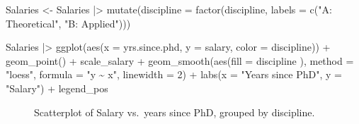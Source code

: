 \documentclass[
  letterpaper,
  10pt,
  krantz2]{krantz}
\makeatletter
\newenvironment{Shaded}{\begin{snugshade}}{\end{snugshade}}
\newcommand{\AttributeTok}[1]{\textcolor[rgb]{0.40,0.45,0.13}{#1}}
\newcommand{\DecValTok}[1]{\textcolor[rgb]{0.68,0.00,0.00}{#1}}
\newcommand{\FunctionTok}[1]{\textcolor[rgb]{0.28,0.35,0.67}{#1}}
\newcommand{\NormalTok}[1]{\textcolor[rgb]{0.00,0.23,0.31}{#1}}
\newcommand{\OtherTok}[1]{\textcolor[rgb]{0.00,0.23,0.31}{#1}}
\newcommand{\SpecialCharTok}[1]{\textcolor[rgb]{0.37,0.37,0.37}{#1}}
\newcommand{\StringTok}[1]{\textcolor[rgb]{0.13,0.47,0.30}{#1}}
\newenvironment{kframe}{%
  \medskip{}
  \setlength{\fboxsep}{.8em}
  \def\at@end@of@kframe{}%
  \ifinner\ifhmode%
  \def\at@end@of@kframe{\end{minipage}}%
  \begin{minipage}{\columnwidth}%
  \fi\fi%
  \def\FrameCommand##1{\hskip\@totalleftmargin \hskip-\fboxsep
  \colorbox{shadecolor}{##1}\hskip-\fboxsep
      \hskip-\linewidth \hskip-\@totalleftmargin \hskip\columnwidth}%
  \MakeFramed {\advance\hsize-\width
    \@totalleftmargin\z@ \linewidth\hsize
    \@setminipage}}%
{\par\unskip\endMakeFramed%
  \at@end@of@kframe}
\renewenvironment{Shaded}{\begin{kframe}}{\end{kframe}}
\makeatother
\begin{document}
\begin{Shaded}
\begin{Highlighting}[]
\NormalTok{Salaries }\OtherTok{\textless{}{-}}\NormalTok{ Salaries }\SpecialCharTok{|\textgreater{}}
  \FunctionTok{mutate}\NormalTok{(}\AttributeTok{discipline =} \FunctionTok{factor}\NormalTok{(discipline, }
                             \AttributeTok{labels =} \FunctionTok{c}\NormalTok{(}\StringTok{"A: Theoretical"}\NormalTok{, }\StringTok{"B: Applied"}\NormalTok{)))}

\NormalTok{Salaries }\SpecialCharTok{|\textgreater{}}
  \FunctionTok{ggplot}\NormalTok{(}\FunctionTok{aes}\NormalTok{(}\AttributeTok{x =}\NormalTok{ yrs.since.phd, }\AttributeTok{y =}\NormalTok{ salary, }\AttributeTok{color =}\NormalTok{ discipline)) }\SpecialCharTok{+}
    \FunctionTok{geom\_point}\NormalTok{() }\SpecialCharTok{+}
\NormalTok{  scale\_salary }\SpecialCharTok{+}
  \FunctionTok{geom\_smooth}\NormalTok{(}\FunctionTok{aes}\NormalTok{(}\AttributeTok{fill =}\NormalTok{ discipline ),}
                \AttributeTok{method =} \StringTok{"loess"}\NormalTok{, }\AttributeTok{formula =} \StringTok{"y \textasciitilde{} x"}\NormalTok{, }
                \AttributeTok{linewidth =} \DecValTok{2}\NormalTok{) }\SpecialCharTok{+} 
  \FunctionTok{labs}\NormalTok{(}\AttributeTok{x =} \StringTok{"Years since PhD"}\NormalTok{,}
       \AttributeTok{y =} \StringTok{"Salary"}\NormalTok{) }\SpecialCharTok{+}
\NormalTok{  legend\_pos }
\end{Highlighting}
\end{Shaded}

\begin{figure}[H]


\caption{\label{fig-Salaries-discipline}Scatterplot of Salary vs.~years
since PhD, grouped by discipline.}

\end{figure}%
\end{document}
